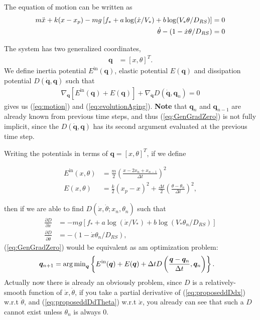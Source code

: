 The equation of motion can be written as 
\begin{align}
    m\Ddot{x} + k(x - x_p) - mg\left[f_* + a\log(\dot{x}/V_*) + b \log(V_* \theta / D_{RS})\right] &= 0 \label{eq:motion}\\
    \dot{\theta} - (1 - \dot{x} \theta / D_{RS}) &= 0 \label{eq:evolutionAging}
\end{align}

The system has two generalized coordinates, 
\begin{align}
    \boldsymbol{q} &= [x, \theta]^T \label{eq:GenCoords}. 
\end{align}
We define inertia potential $E^{\text{in}}(\boldsymbol{q})$, 
elastic potential
$E(\boldsymbol{q})$ and 
dissipation potential $D(\boldsymbol{\dot{q}}, \boldsymbol{q})$ such that
\begin{align}
    \nabla_{\boldsymbol{q}} \left[E^{\text{in}}(\boldsymbol{q}) + E(\boldsymbol{q})\right] + \nabla_{\dot{\boldsymbol{q}}}D(\boldsymbol{\dot{q}}, \boldsymbol{q}_n) = 0 \label{eq:GenGradZero}
\end{align}
gives us (\ref{eq:motion}) and (\ref{eq:evolutionAging}).
\textbf{Note} that $\boldsymbol{q}_n$ and $\boldsymbol{q}_{n-1}$ are already known from previous time steps, 
and thus (\ref{eq:GenGradZero}) is not fully implicit, 
since the $D(\boldsymbol{\dot{q}}, \boldsymbol{q})$ has its second argument evaluated at the previous time step. 

Writing the potentials in terms of $\boldsymbol{q} = [x, \theta]^T$, 
if we define 

\begin{align}
    E^{\text{in}}(x, \theta) &= \frac{m}{2} \left(\frac{x - 2x_n+x_{n-1}}{\Delta t}\right)^2 \label{eq:Ein}\\
    E(x, \theta) &= \frac{k}{2}(x_p - x)^2 + \frac{\Delta t}{2} \left(\frac{\theta - \theta_n}{\Delta t}\right)^2 \label{eq:Eelastic}, 
\end{align}

\noindent then if we are able to find $D(\dot{x}, \dot{\theta}; x_n, \theta_n)$ such that 
\begin{align}
    \frac{\partial D}{\partial \dot{x}} &= -mg\left[f_* + a\log(\dot{x}/V_*) + b \log(V_* \theta_n / D_{RS})\right] \label{eq:proposeddDdx} \\
    \frac{\partial D}{\partial \dot{\theta}} &= - (1 - \dot{x} \theta_n / D_{RS}) \label{eq:proposeddDdTheta}, 
\end{align}
(\ref{eq:GenGradZero}) would be equivalent as am optimization problem:
\begin{align}
    \boldsymbol{q}_{n+1} &= \operatorname{arg\,min}_{\boldsymbol{q}} \left\{E^{\text{in}}(\boldsymbol{q}) + E(\boldsymbol{q}) + \Delta t D\left(\frac{\boldsymbol{q}-\boldsymbol{q}_n}{\Delta t}, \boldsymbol{q}_n\right)\right\} \label{eq:OptProb}. 
\end{align}
Actually now there is already an obviously problem, 
since $D$ is a relatively-smooth function of $\dot{x}, \dot{\theta}$, 
if you take a partial derivative of (\ref{eq:proposeddDdx}) w.r.t $\dot{\theta}$, 
and (\ref{eq:proposeddDdTheta}) w.r.t $\dot{x}$, 
you already can see that such a $D$ cannot exist unless $\theta_n$ is always $0$. 

